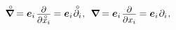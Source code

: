 \nopagebreak\vspace{-0.25em}\begin{equation*}
\boldnablacircled \hspace{-0.1ex}
= \bm{e}_i \hspace{.2ex} \scalebox{0.9}{$ \displaystyle \frac{\raisemath{-0.2em}{\partial}}{\partial \mathcircabove{x}_i} $} \hspace{-0.1ex}
= \bm{e}_i \hspace{.15ex} \mathcircabove{\partial}_i
\hspace{.1ex} , \:\:
%
\boldnabla \hspace{-0.1ex}
= \bm{e}_i \hspace{.2ex} \scalebox{0.9}{$ \displaystyle \frac{\raisemath{-0.2em}{\partial}}{\partial x_i} $} \hspace{-0.1ex}
= \bm{e}_i \hspace{.15ex} \partial_i
\hspace{.1ex} ,
\end{equation*}

